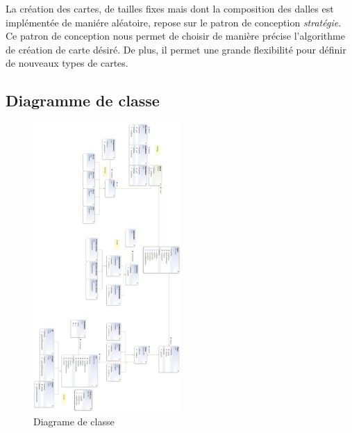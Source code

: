		La création des cartes, de tailles fixes mais dont la composition des dalles est implémentée de maniére aléatoire, repose sur le patron de conception \emph{stratégie}. Ce patron de conception nous permet de choisir de manière précise l'algorithme de création de carte désiré. De plus, il permet une grande flexibilité pour définir de nouveaux types de cartes.



	\subsection{Diagramme de classe}


	\begin{figure}
		\begin{center}
			\includegraphics[width=0.5\textwidth]{figure/entire_class_diagram}
		\end{center}
		\caption{Diagrame de classe}
		\label{fig:planif}
	\end{figure}




